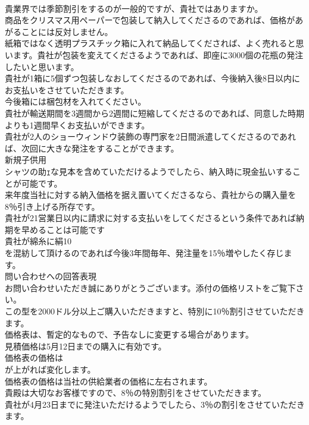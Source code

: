 \documentclass[8pt]{extreport}
\begin{document}
\begin{CJK}{UTF8}{min}
\\	貴業界では季節割引をするのが一般的ですが、貴社ではありますか。  
\\	商品をクリスマス用ペーパーで包装して納入してくださるのであれば、価格があがることには反対しません。   
\\	紙箱ではなく透明プラスチック箱に入れて納品してくだされば、よく売れると思います。貴社が包装を変えてくださるようであれば、即座に3000個の花瓶の発注したいと思います。  
\\	貴社が1箱に5個ずつ包装しなおしてくださるのであれば、今後納入後8日以内にお支払いをさせていただきます。  
\\	今後箱には梱包材を入れてください。   
\\	貴社が輸送期間を3週間から2週間に短縮してくださるのであれば、同意した時期よりも1週間早くお支払いができます。   
\\	貴社が2人のショーウィンドウ装飾の専門家を2日間派遣してくださるのであれば、次回に大きな発注をすることができます。   
\\	新規子供用
\\	シャツの助ｪな見本を含めていただけるようでしたら、納入時に現金払いすることが可能です。  
\\	来年度当社に対する納入価格を据え置いてくださるなら、貴社からの購入量を8％引き上げる所存です。   
\\	貴社が21営業日以内に請求に対する支払いをしてくださるという条件であれば納期を早めることは可能です  
\\	貴社が綿糸に絹10
\\	を混紡して頂けるのであれば今後3年間毎年、発注量を15％増やしたく存じます。  
\\	問い合わせへの回答表現  
\\	お問い合わせいただき誠にありがとうございます。添付の価格リストをご覧下さい。  
\\	この型を2000ドル分以上ご購入いただきますと、特別に10％割引させていただきます。   
\\	価格表は、暫定的なもので、予告なしに変更する場合があります。  
\\	見積価格は5月12日までの購入に有効です。  
\\	価格表の価格は
\\	が上がれば変化します。  
\\	価格表の価格は当社の供給業者の価格に左右されます。   
\\	貴殿は大切なお客様ですので、8％の特別割引をさせていただきます。  
\\	貴社が4月23日までに発注いただけるようでしたら、3％の割引をさせていただきます。  

\end{CJK}
\end{document}
